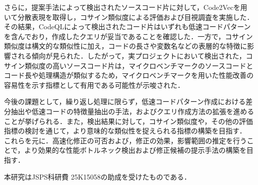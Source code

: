\documentclass[submit,techrep,noauthor]{ipsj}
\begin{document}
さらに，提案手法によって検出されたソースコード片に対して，Code2Vecを用いて分散表現を取得し，コサイン類似度による評価および目視調査を実施した．その結果，CodeQLによって検出されたコード片はいずれも低速コードパターンを含んでおり，作成したクエリが妥当であることを確認した．一方で，コサイン類似度は構文的な類似性に加え，コードの長さや変数名などの表層的な特徴に影響される傾向が見られた．したがって，実プロジェクトにおいて検出された，コサイン類似度の高いソースコード片は，マイクロベンチマークのソースコードとコード長や処理構造が類似するため，マイクロベンチマークを用いた性能改善の容易性を示す指標として有用である可能性が示唆された．

今後の課題として，繰り返し処理に限らず，低速コードパターン作成における差分抽出や低速コードの特徴量抽出の手法，およびクエリ作成方法の拡張を進めることが挙げられる．また，検出結果に対して，コサイン類似度や，その他の評価指標の検討を通じて，より意味的な類似性を捉えられる指標の構築を目指す．
これらを元に．高速化修正の可否および，修正の効果，影響範囲の推定を行うことで，より効果的な性能ボトルネック検出および修正候補の提示手法の構築を目指す．

\begin{acknowledgment}
本研究はJSPS科研費 25K15058の助成を受けたものである．
\end{acknowledgment}





\end{document}
